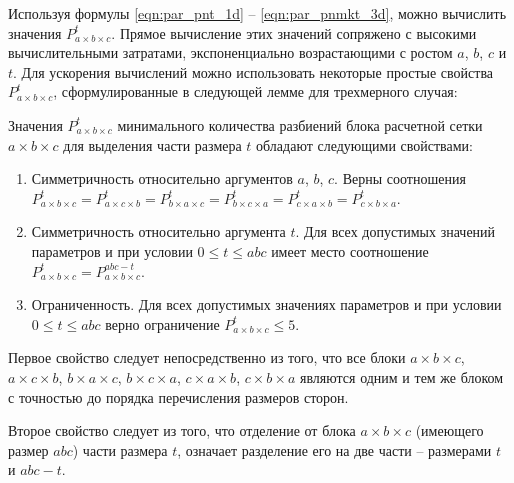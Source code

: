 Используя формулы \eqref{eqn:par_pnt_1d} -- \eqref{eqn:par_pnmkt_3d}, можно вычислить значения $P_{a \times b \times c}^t$.
Прямое вычисление этих значений сопряжено с высокими вычислительными затратами, экспоненциально возрастающими с ростом $a$, $b$, $c$ и $t$.
Для ускорения вычислений можно использовать некоторые простые свойства $P_{a \times b \times c}^t$, сформулированные в следующей лемме для трехмерного случая:

\begin{lemma}\label{lem:par_pnmkt_properties}
Значения $P_{a \times b \times c}^t$ минимального количества разбиений блока расчетной сетки $a \times b \times c$ для выделения части размера $t$ обладают следующими свойствами:
\begin{enumerate}[noitemsep,topsep=0pt,parsep=0pt,partopsep=0pt]
\item Симметричность относительно аргументов $a$, $b$, $c$. Верны соотношения $P_{a \times b \times c}^t = P_{a \times c \times b}^t = P_{b \times a \times c}^t = P_{b \times c \times a}^t = P_{c \times a \times b}^t = P_{c \times b \times a}^t$. 
\item Симметричность относительно аргумента $t$. Для всех допустимых значений параметров и при условии $0 \le t \le abc$ имеет место соотношение $P_{a \times b \times c}^t = P_{a \times b \times c}^{abc - t}$.
\item Ограниченность. Для всех допустимых значениях параметров и при условии $0 \le t \le abc$ верно ограничение $P_{a \times b \times c}^t \le 5$.
\end{enumerate}
\end{lemma}

Первое свойство следует непосредственно из того, что все блоки $a \times b \times c$, $a \times c \times b$, $b \times a \times c$, $b \times c \times a$, $c \times a \times b$, $c \times b \times a$ являются одним и тем же блоком с точностью до порядка перечисления размеров сторон.

Второе свойство следует из того, что отделение от блока $a \times b \times c$ (имеющего размер $abc$) части размера $t$, означает разделение его на две части -- размерами $t$ и $abc - t$.

